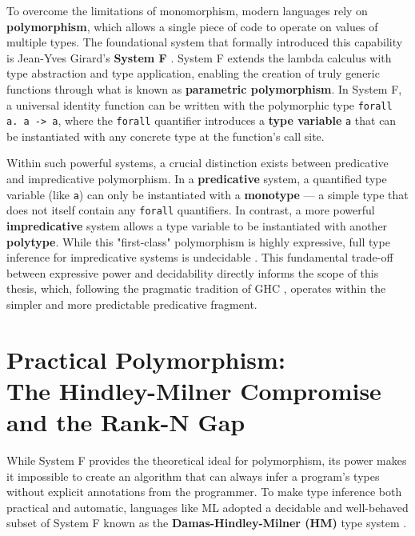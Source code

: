 To overcome the limitations of monomorphism, modern languages rely on \textbf{polymorphism}, which allows a single piece of code to operate on values of multiple types. The foundational system that formally introduced this capability is Jean-Yves Girard's \textbf{System F} \cite{girard-system-f}. System F extends the lambda calculus with type abstraction and type application, enabling the creation of truly generic functions through what is known as \textbf{parametric polymorphism}. In System F, a universal identity function can be written with the polymorphic type \texttt{forall a. a -> a}, where the \texttt{forall} quantifier introduces a \textbf{type variable} \texttt{a} that can be instantiated with any concrete type at the function's call site.

Within such powerful systems, a crucial distinction exists between predicative and impredicative polymorphism. In a \textbf{predicative} system, a quantified type variable (like \texttt{a}) can only be instantiated with a \textbf{monotype} --- a simple type that does not itself contain any \texttt{forall} quantifiers. In contrast, a more powerful \textbf{impredicative} system allows a type variable to be instantiated with another \textbf{polytype}. While this "first-class" polymorphism is highly expressive, full type inference for impredicative systems is undecidable \cite{wells-typability-1999, serrano-quick-2020}. This fundamental trade-off between expressive power and decidability directly informs the scope of this thesis, which, following the pragmatic tradition of GHC \cite{jones-practical-2007}, operates within the simpler and more predictable predicative fragment.

\section[Practical Polymorphism: The Hindley-Milner Compromise and the Rank-N Gap]{Practical Polymorphism: \\ The Hindley-Milner Compromise \\ and the Rank-N Gap}
\label{sec:LitReviewHM}

While System F provides the theoretical ideal for polymorphism, its power makes it impossible to create an algorithm that can always infer a program's types without explicit annotations from the programmer. To make type inference both practical and automatic, languages like ML adopted a decidable and well-behaved subset of System F known as the \textbf{Damas-Hindley-Milner (HM)} type system \cite{damas-milner}.

